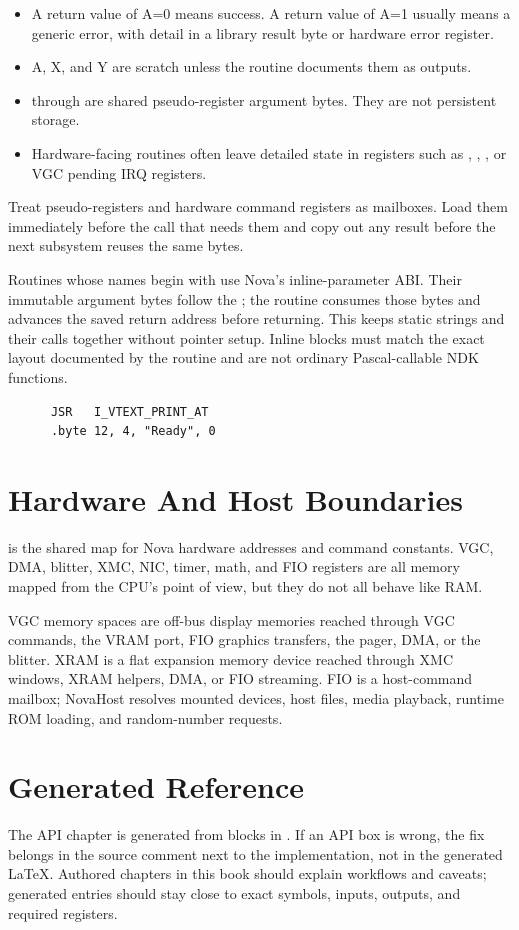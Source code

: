 \begin{itemize}
\item A return value of A=0 means success. A return value of A=1 usually means a
generic error, with detail in a library result byte or hardware error register.
\item A, X, and Y are scratch unless the routine documents them as outputs.
\item {} through  are shared pseudo-register
argument bytes. They are not persistent storage.
\item Hardware-facing routines often leave detailed state in registers such as
, , , or VGC
pending IRQ registers.
\end{itemize}

Treat pseudo-registers and hardware command registers as mailboxes. Load them
immediately before the call that needs them and copy out any result before the
next subsystem reuses the same bytes.

Routines whose names begin with  use Nova's inline-parameter ABI.
Their immutable argument bytes follow the ; the routine consumes
those bytes and advances the saved return address before returning. This keeps
static strings and their calls together without pointer setup. Inline blocks
must match the exact layout documented by the routine and are not ordinary
Pascal-callable NDK functions.

\begin{lstlisting}
      JSR   I_VTEXT_PRINT_AT
      .byte 12, 4, "Ready", 0
\end{lstlisting}

\section{Hardware And Host Boundaries}

 is the shared map for Nova hardware addresses and command
constants. VGC, DMA, blitter, XMC, NIC, timer, math, and FIO registers are all
memory mapped from the CPU's point of view, but they do not all behave like
RAM.

VGC memory spaces are off-bus display memories reached through VGC commands,
the VRAM port, FIO graphics transfers, the pager, DMA, or the blitter. XRAM is a
flat expansion memory device reached through XMC windows, XRAM helpers, DMA, or
FIO streaming. FIO is a host-command mailbox; NovaHost resolves mounted devices,
host files, media playback, runtime ROM loading, and random-number requests.

\section{Generated Reference}

The API chapter is generated from  blocks in
. If an API box is wrong, the fix belongs in the source
comment next to the implementation, not in the generated LaTeX. Authored
chapters in this book should explain workflows and caveats; generated entries
should stay close to exact symbols, inputs, outputs, and required registers.
